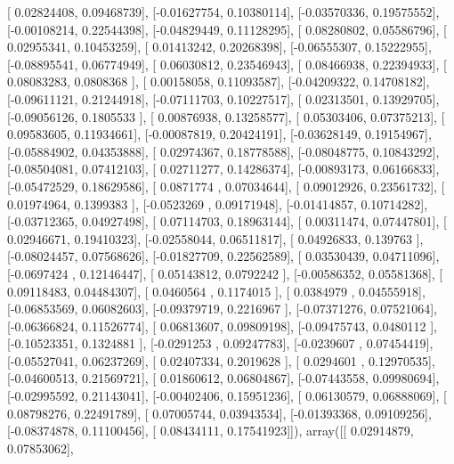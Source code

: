 \documentclass{article}
\begin{document}
       [ 0.02824408,  0.09468739],
       [-0.01627754,  0.10380114],
       [-0.03570336,  0.19575552],
       [-0.00108214,  0.22544398],
       [-0.04829449,  0.11128295],
       [ 0.08280802,  0.05586796],
       [ 0.02955341,  0.10453259],
       [ 0.01413242,  0.20268398],
       [-0.06555307,  0.15222955],
       [-0.08895541,  0.06774949],
       [ 0.06030812,  0.23546943],
       [ 0.08466938,  0.22394933],
       [ 0.08083283,  0.0808368 ],
       [ 0.00158058,  0.11093587],
       [-0.04209322,  0.14708182],
       [-0.09611121,  0.21244918],
       [-0.07111703,  0.10227517],
       [ 0.02313501,  0.13929705],
       [-0.09056126,  0.1805533 ],
       [ 0.00876938,  0.13258577],
       [ 0.05303406,  0.07375213],
       [ 0.09583605,  0.11934661],
       [-0.00087819,  0.20424191],
       [-0.03628149,  0.19154967],
       [-0.05884902,  0.04353888],
       [ 0.02974367,  0.18778588],
       [-0.08048775,  0.10843292],
       [-0.08504081,  0.07412103],
       [ 0.02711277,  0.14286374],
       [-0.00893173,  0.06166833],
       [-0.05472529,  0.18629586],
       [ 0.0871774 ,  0.07034644],
       [ 0.09012926,  0.23561732],
       [ 0.01974964,  0.1399383 ],
       [-0.0523269 ,  0.09171948],
       [-0.01414857,  0.10714282],
       [-0.03712365,  0.04927498],
       [ 0.07114703,  0.18963144],
       [ 0.00311474,  0.07447801],
       [ 0.02946671,  0.19410323],
       [-0.02558044,  0.06511817],
       [ 0.04926833,  0.139763  ],
       [-0.08024457,  0.07568626],
       [-0.01827709,  0.22562589],
       [ 0.03530439,  0.04711096],
       [-0.0697424 ,  0.12146447],
       [ 0.05143812,  0.0792242 ],
       [-0.00586352,  0.05581368],
       [ 0.09118483,  0.04484307],
       [ 0.0460564 ,  0.1174015 ],
       [ 0.0384979 ,  0.04555918],
       [-0.06853569,  0.06082603],
       [-0.09379719,  0.2216967 ],
       [-0.07371276,  0.07521064],
       [-0.06366824,  0.11526774],
       [ 0.06813607,  0.09809198],
       [-0.09475743,  0.0480112 ],
       [-0.10523351,  0.1324881 ],
       [-0.0291253 ,  0.09247783],
       [-0.0239607 ,  0.07454419],
       [-0.05527041,  0.06237269],
       [ 0.02407334,  0.2019628 ],
       [ 0.0294601 ,  0.12970535],
       [-0.04600513,  0.21569721],
       [ 0.01860612,  0.06804867],
       [-0.07443558,  0.09980694],
       [-0.02995592,  0.21143041],
       [-0.00402406,  0.15951236],
       [ 0.06130579,  0.06888069],
       [ 0.08798276,  0.22491789],
       [ 0.07005744,  0.03943534],
       [-0.01393368,  0.09109256],
       [-0.08374878,  0.11100456],
       [ 0.08434111,  0.17541923]]), array([[ 0.02914879,  0.07853062],
\end{document}
